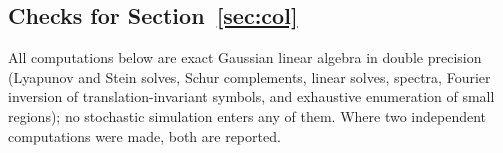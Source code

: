 \subsection{Checks for \texorpdfstring{Section~\ref{sec:col}}{collectives}}\label{chk:col}

All computations below are exact Gaussian linear algebra in double precision (Lyapunov and Stein solves, Schur complements, linear solves, spectra, Fourier inversion of translation-invariant symbols, and exhaustive enumeration of small regions); no stochastic simulation enters any of them. Where two independent computations were made, both are reported.

\begin{numcheck}\label{chk:col-path}

\end{numcheck}
